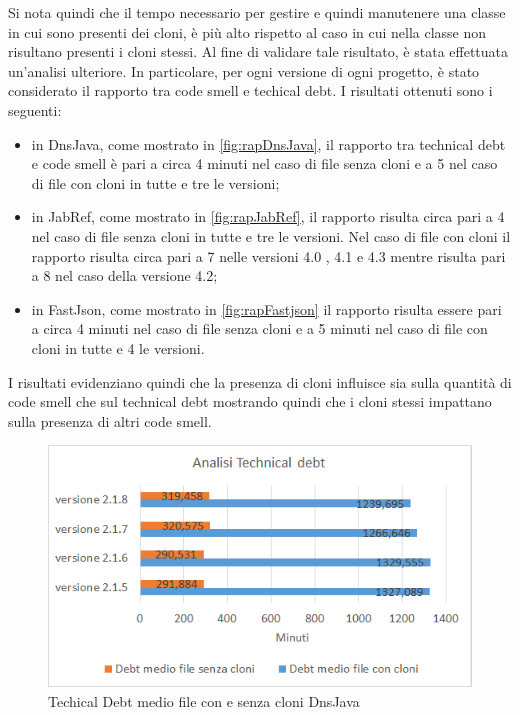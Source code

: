 Si nota quindi che il tempo necessario per gestire e quindi manutenere una classe in cui sono presenti dei cloni, è più alto rispetto al caso in cui nella classe non risultano presenti i cloni stessi. Al fine di validare tale risultato, è stata effettuata un'analisi ulteriore. In particolare, per ogni versione di ogni progetto, è stato considerato il rapporto tra code smell e techical debt. I risultati ottenuti sono i seguenti:
\begin{itemize}
	\item in DnsJava, come mostrato in \autoref{fig:rapDnsJava}, il rapporto tra technical debt e code smell è pari a circa 4 minuti nel caso di file senza cloni e a 5 nel caso di file con cloni in tutte e tre le versioni;
	\item in JabRef, come mostrato in \autoref{fig:rapJabRef}, il rapporto risulta circa pari a 4 nel caso di file senza cloni in tutte e tre le versioni. Nel caso di file con cloni il rapporto risulta circa pari a 7 nelle versioni 4.0 , 4.1 e 4.3 mentre risulta pari a 8 nel caso della versione 4.2;
	\item in FastJson, come mostrato in \autoref{fig:rapFastjson} il rapporto risulta essere pari a circa 4 minuti nel caso di file senza cloni e a 5 minuti nel caso di file con cloni in tutte e 4 le versioni.
\end{itemize}
I risultati evidenziano quindi che la presenza di cloni influisce sia sulla quantità di code smell che sul technical debt mostrando quindi che i cloni stessi impattano sulla presenza di altri code smell.
\begin{figure}[h]
	\centering
	\includegraphics[scale=0.75, trim = 0cm 0cm 0cm 0cm, clip=true]{Grafici_dnsJava/TechnicalDebt.png}
	\caption{Techical Debt medio file con e senza cloni DnsJava}
	\label{fig:tdDnsJava}	
\end{figure}

